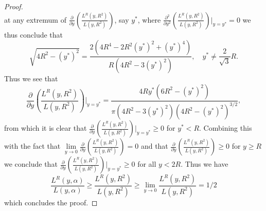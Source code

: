 \documentclass[a4paper,11pt]{article}
\numberwithin{equation}{section}
\begin{document}
\begin{proof}
\begin{equation}
		\end{equation}
		at any extremum of $ \frac{\partial}{\partial y}\left(\frac{L^R(y,R^2)}{L(y,R^2)}\right) $, say $ y^* $, where $ \frac{\partial^2}{\partial y^2}\left(\frac{L^R(y,R^2)}{L(y,R^2)}\right)\rvert_{y=y^*}=0 $ we thus conclude that \begin{equation}
		\sqrt{4R^2-(y^*)^2}=\frac{2 \left(4 R^4-2 R^2 (y^*)^2+(y^*)^4\right)}{R \left(4 R^2-3 (y^*)^2\right)},\quad  y^*\neq \frac{2}{\sqrt{3}}R .
		\end{equation}
		Thus we see that \begin{equation}
		\frac{\partial}{\partial y}\left(\frac{L^R(y,R^2)}{L(y,R^2)}\right)|_{y=y^*}=\frac{4 R y^* \left(6 R^2-(y^*)^2\right)}{\pi  \left(4 R^2-3 (y^*)^2\right) \left(4 R^2-(y^*)^2\right)^{3/2}},
		\end{equation}
		from which it is clear that $ \frac{\partial}{\partial y}\left(\frac{L^R(y,R^2)}{L(y,R^2)}\right)|_{y=y^*}\geq0 $ for $ y^*<R $. Combining this with the fact that $ \lim\limits_{y\to 0}\frac{\partial}{\partial y}\left(\frac{L^R(y,R^2)}{L(y,R^2)}\right)=0 $ and that $ \frac{\partial}{\partial y}\left(\frac{L^R(y,R^2)}{L(y,R^2)}\right)\geq0 $ for $ y\geq R $ we conclude that $ \frac{\partial}{\partial y}\left(\frac{L^R(y,R^2)}{L(y,R^2)}\right)|_{y=y^*}\geq0 $ for all $ y<2R $. Thus we have \begin{equation}
		\frac{L^R(y,\alpha)}{L(y,\alpha)}\geq\frac{L^R(y,R^2)}{L(y,R^2)}\geq\lim\limits_{y\to 0}\frac{L^R(y,R^2)}{L(y,R^2)}=1/2
		\end{equation}
		which concludes the proof.
	\end{proof}
	
\end{document}
